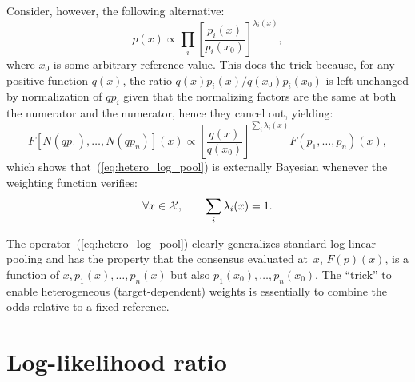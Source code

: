 \documentclass[english]{scrartcl}
\begin{document}
Consider, however, the following alternative:
\begin{equation}
\label{eq:hetero_log_pool}
p(x) \propto \prod_i \left[\frac{p_i(x)}{p_i(x_0)}\right]^{\lambda_i(x)},    
\end{equation}
where $x_0$ is some arbitrary reference value. This does the trick because, for any positive function $q(x)$, the ratio $q(x)p_i(x)/q(x_0)p_i(x_0)$ is left unchanged by normalization of $q p_i$ given that the normalizing factors are the same at both the numerator and the numerator, hence they cancel out, yielding:
$$
F[N(q p_1), \ldots, N(q p_n)](x)
\propto
\left[\frac{q(x)}{q(x_0)}\right]^{\sum_i \lambda_i(x)}
F(p_1, \ldots, p_n)(x),
$$
which shows that~(\ref{eq:hetero_log_pool}) is externally Bayesian whenever the weighting function verifies:
$$
\forall x \in {\cal X},
\qquad
\sum_i \lambda_i(x) = 1.
$$

The operator~(\ref{eq:hetero_log_pool}) clearly generalizes standard log-linear pooling and has the property that the consensus evaluated at~$x$, $F(p)(x)$, is a function of $x,p_1(x),\ldots,p_n(x)$ but also $p_1(x_0),\ldots,p_n(x_0)$. The ``trick'' to enable heterogeneous (target-dependent) weights is essentially to combine the odds relative to a fixed reference.

 



\section{Log-likelihood ratio}
\end{document}
